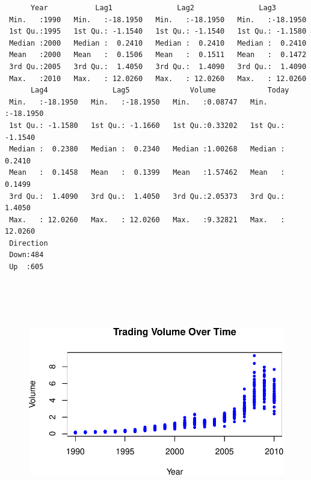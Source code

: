 \documentclass[
]{article}
\newenvironment{Shaded}{\begin{snugshade}}{\end{snugshade}}
\newcommand{\AttributeTok}[1]{\textcolor[rgb]{0.40,0.45,0.13}{#1}}
\newcommand{\CommentTok}[1]{\textcolor[rgb]{0.37,0.37,0.37}{#1}}
\newcommand{\DecValTok}[1]{\textcolor[rgb]{0.68,0.00,0.00}{#1}}
\newcommand{\FunctionTok}[1]{\textcolor[rgb]{0.28,0.35,0.67}{#1}}
\newcommand{\NormalTok}[1]{\textcolor[rgb]{0.00,0.23,0.31}{#1}}
\newcommand{\SpecialCharTok}[1]{\textcolor[rgb]{0.37,0.37,0.37}{#1}}
\newcommand{\StringTok}[1]{\textcolor[rgb]{0.13,0.47,0.30}{#1}}
\begin{document}
\begin{verbatim}
      Year           Lag1               Lag2               Lag3         
 Min.   :1990   Min.   :-18.1950   Min.   :-18.1950   Min.   :-18.1950  
 1st Qu.:1995   1st Qu.: -1.1540   1st Qu.: -1.1540   1st Qu.: -1.1580  
 Median :2000   Median :  0.2410   Median :  0.2410   Median :  0.2410  
 Mean   :2000   Mean   :  0.1506   Mean   :  0.1511   Mean   :  0.1472  
 3rd Qu.:2005   3rd Qu.:  1.4050   3rd Qu.:  1.4090   3rd Qu.:  1.4090  
 Max.   :2010   Max.   : 12.0260   Max.   : 12.0260   Max.   : 12.0260  
      Lag4               Lag5              Volume            Today         
 Min.   :-18.1950   Min.   :-18.1950   Min.   :0.08747   Min.   :-18.1950  
 1st Qu.: -1.1580   1st Qu.: -1.1660   1st Qu.:0.33202   1st Qu.: -1.1540  
 Median :  0.2380   Median :  0.2340   Median :1.00268   Median :  0.2410  
 Mean   :  0.1458   Mean   :  0.1399   Mean   :1.57462   Mean   :  0.1499  
 3rd Qu.:  1.4090   3rd Qu.:  1.4050   3rd Qu.:2.05373   3rd Qu.:  1.4050  
 Max.   : 12.0260   Max.   : 12.0260   Max.   :9.32821   Max.   : 12.0260  
 Direction 
 Down:484  
 Up  :605  
           
           
           
           
\end{verbatim}

\begin{Shaded}
\end{Shaded}

\begin{figure}[H]

{\centering \includegraphics{hw2_files/figure-pdf/unnamed-chunk-4-1.pdf}

}

\end{figure}
\end{document}
